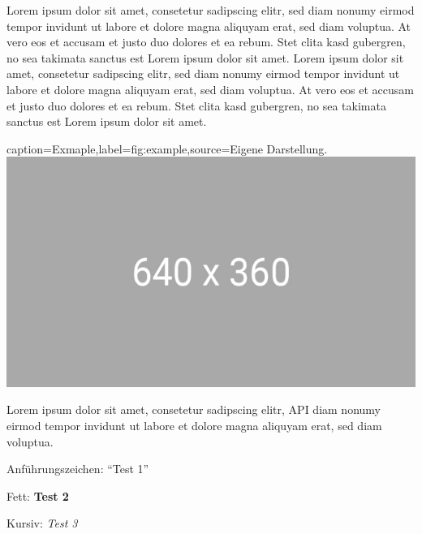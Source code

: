 Lorem ipsum dolor sit amet, consetetur sadipscing elitr, sed diam nonumy eirmod tempor invidunt ut labore et dolore magna aliquyam erat, sed diam voluptua. 
At vero eos et accusam et justo duo dolores et ea rebum. Stet clita kasd gubergren, no sea takimata sanctus est Lorem ipsum dolor sit amet. 
Lorem ipsum dolor sit amet, consetetur sadipscing elitr, sed diam nonumy eirmod tempor invidunt ut labore et dolore magna aliquyam erat, sed diam voluptua. 
At vero eos et accusam et justo duo dolores et ea rebum. Stet clita kasd gubergren, no sea takimata sanctus est Lorem ipsum dolor sit amet.

\begin{dhbwfigure}{caption=Exmaple,label=fig:example,source={Eigene Darstellung.}}
    \includegraphics[width=\textwidth]{assets/figures/example.jpg}
\end{dhbwfigure}

Lorem ipsum dolor sit amet, consetetur sadipscing elitr, \ac{API} diam nonumy eirmod tempor invidunt ut labore et dolore magna aliquyam erat, sed diam voluptua. 

Anführungszeichen: \enquote{Test 1}

Fett: \textbf{Test 2}

Kursiv: \textit{Test 3}
